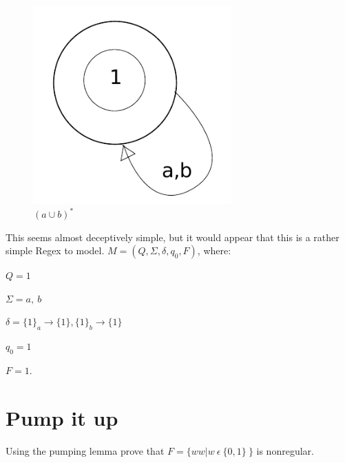 \documentclass[10pt,reqno,sumlimits]{amsart}
\theoremstyle{plain}
\theoremstyle{definition}
\newcommand{\1}{{\bf 1}}
\numberwithin{equation}{section}
\begin{document}
\begin{figure}[htbp]
\centerline{
    \mbox{\includegraphics[width=3.0in]{algorithms2_3.pdf}}
  }
  \caption{$(a \cup b)^*$}
  \label{fig:fit}
\end{figure}

\hspace{0.5in} This seems almost deceptively simple, but it would appear that this is a rather simple Regex to model. $M = (Q, \Sigma, \delta, q_0 , F )$, where:

\vspace{0.2in}
$ Q = 1$

$\Sigma = a,\ b$

$\delta = \{1\}_a \rightarrow \{1\}, \{1\}_b \rightarrow \{1\}$

$q_0 = 1$

$F = 1$.
\vspace{0.2in}

\section{Pump it up}
Using the pumping lemma prove that $F = \{ww|w\  \epsilon\  \{0, 1\}\ \}$ is nonregular.
\end{document}
